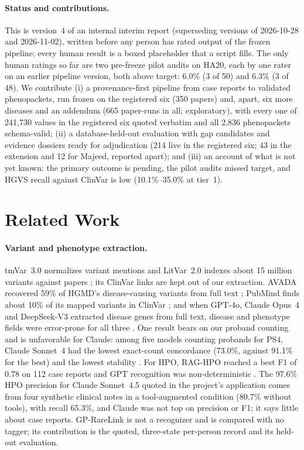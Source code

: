 \documentclass{article} %
\begin{document}
\paragraph{Status and contributions.} This is version~4 of an internal interim report (superseding versions of 2026-10-28 and 2026-11-02), written before any person has rated output of the frozen pipeline; every human result is a boxed placeholder that a script fills. The only human ratings so far are two pre-freeze pilot audits on HA20, each by one rater on an earlier pipeline version, both above target: 6.0\% (3 of 50) and 6.3\% (3 of 48). We contribute (i) a provenance-first pipeline from case reports to validated phenopackets, run frozen on the registered six (350 papers) and, apart, six more diseases and an addendum (665 paper-runs in all; exploratory), with every one of 241,730 values in the registered six quoted verbatim and all 2,836 phenopackets schema-valid; (ii) a database-held-out evaluation with gap candidates and evidence dossiers ready for adjudication (214 live in the registered six; 43 in the extension and 12 for Majeed, reported apart); and (iii) an account of what is not yet known: the primary outcome is pending, the pilot audits missed target, and HGVS recall against ClinVar is low (10.1\%--35.0\% at tier~1).

\section{Related Work}
\label{sec:related_work}
\paragraph{Variant and phenotype extraction.} tmVar~3.0 normalizes variant mentions \citep{wei2022_tmvar3} and LitVar~2.0 indexes about 15 million variants against papers \citep{allot2023_litvar2}; its ClinVar links are kept out of our extraction. AVADA recovered 59\% of HGMD's disease-causing variants from full text \citep{birgmeier2020_avada}; PubMind finds about 10\% of its mapped variants in ClinVar \citep{wang2025_pubmind}; and when GPT-4o, Claude Opus~4 and DeepSeek-V3 extracted disease genes from full text, disease and phenotype fields were error-prone for all three \citep{yin2025_llm_disease_genes}. One result bears on our proband counting and is unfavorable for Claude: among five models counting probands for PS4, Claude Sonnet~4 had the lowest exact-count concordance (73.0\%, against 91.1\% for the best) and the lowest stability \citep{murugan2026_reasoning_llm_ps4}. For HPO, RAG-HPO reached a best F1 of 0.78 on 112 case reports \citep{garcia2025_raghpo} and GPT recognition was non-deterministic \citep{groza2024_gpt_hpo}. The 97.6\% HPO precision for Claude Sonnet~4.5 quoted in the project's application \citep{larsen2026_hpo_mcp} comes from four synthetic clinical notes in a tool-augmented condition (80.7\% without tools), with recall 65.3\%, and Claude was not top on precision or F1; it says little about case reports. GP-RareLink is not a recognizer and is compared with no tagger; its contribution is the quoted, three-state per-person record and its held-out evaluation.
\end{document}
